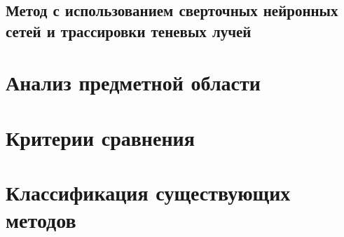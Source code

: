 \subsection{Метод с использованием сверточных нейронных сетей и трассировки теневых лучей}

\section{Анализ предметной области}



\section{Критерии сравнения}



\section{Классификация существующих методов}



